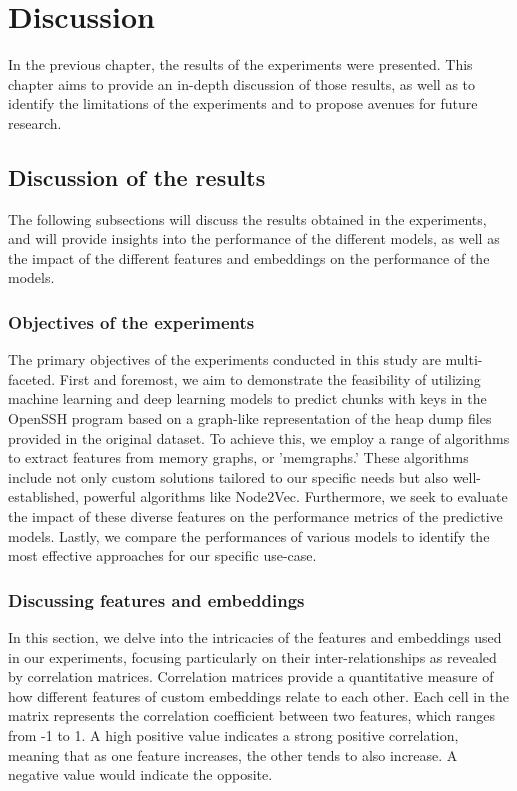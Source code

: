 \chapter{Discussion}\label{chap:discussion}
In the previous chapter, the results of the experiments were presented. This chapter aims to provide an in-depth discussion of those results, as well as to identify the limitations of the experiments and to propose avenues for future research.

\section{Discussion of the results}
The following subsections will discuss the results obtained in the experiments, and will provide insights into the performance of the different models, as well as the impact of the different features and embeddings on the performance of the models.

\subsection{Objectives of the experiments}

The primary objectives of the experiments conducted in this study are multi-faceted. First and foremost, we aim to demonstrate the feasibility of utilizing machine learning and deep learning models to predict chunks with keys in the OpenSSH program based on a graph-like representation of the heap dump files provided in the original dataset. To achieve this, we employ a range of algorithms to extract features from memory graphs, or 'memgraphs.' These algorithms include not only custom solutions tailored to our specific needs but also well-established, powerful algorithms like Node2Vec. Furthermore, we seek to evaluate the impact of these diverse features on the performance metrics of the predictive models. Lastly, we compare the performances of various models to identify the most effective approaches for our specific use-case.

\subsection{Discussing features and embeddings}

In this section, we delve into the intricacies of the features and embeddings used in our experiments, focusing particularly on their inter-relationships as revealed by correlation matrices. Correlation matrices provide a quantitative measure of how different features of custom embeddings relate to each other. Each cell in the matrix represents the correlation coefficient between two features, which ranges from -1 to 1. A high positive value indicates a strong positive correlation, meaning that as one feature increases, the other tends to also increase. A negative value would indicate the opposite.

